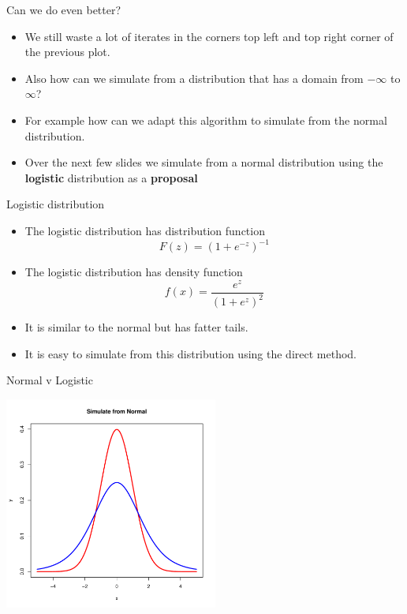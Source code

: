 \documentclass
[handout]
{beamer}
\begin{document}
\begin{frame}{Can we do even better?}
\begin{itemize}
\item We still waste a lot of iterates in the corners top left and top right corner of the previous plot.
\pause
\item Also how can we simulate from a distribution that has a domain from $-\infty$ to $\infty$? 
\pause
\item For example how can we adapt this algorithm to simulate from the normal distribution.
\pause
\item Over the next few slides we simulate from a normal distribution using the {\bf logistic} distribution as a {\bf proposal}
\end{itemize}
\end{frame}
\begin{frame}{Logistic distribution}
\begin{itemize}
\item The logistic distribution has distribution function
\begin{equation}
F(z)=(1+e^{-z})^{-1}
\end{equation}
\pause
\item The logistic distribution has density function
\begin{equation}
f(x)=\frac{e^z}{(1+e^z)^{2}}
\end{equation}
\pause
\item It is similar to the normal but has fatter tails.
\pause
\item It is easy to simulate from this distribution using the direct method.
\end{itemize}
\end{frame}
\begin{frame}{Normal v Logistic}
\begin{center}
\includegraphics[height=7cm]{./Pics/nmlg1.pdf}
\end{center}
\end{frame}
\end{document}

